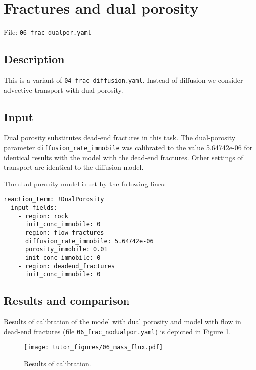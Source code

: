 \section{Fractures and dual porosity}

File: \texttt{06\_frac\_dualpor.yaml}

\subsection{Description}

This is a variant of \texttt{04\_frac\_diffusion.yaml}. Instead of
diffusion we consider advective transport with dual porosity.

\subsection{Input}

Dual porosity substitutes dead-end fractures in this task. The
dual-porosity parameter \texttt{diffusion\_rate\_immobile} was
calibrated to the value 5.64742e-06 for identical results with the model
with the dead-end fractures. Other settings of transport are identical
to the diffusion model.

The dual porosity model is set by the following lines:

\begin{verbatim}
reaction_term: !DualPorosity
  input_fields:
    - region: rock
      init_conc_immobile: 0
    - region: flow_fractures
      diffusion_rate_immobile: 5.64742e-06
      porosity_immobile: 0.01
      init_conc_immobile: 0
    - region: deadend_fractures
      init_conc_immobile: 0
\end{verbatim}

\subsection{Results and comparison}

Results of calibration of the model with dual porosity and model with
flow in dead-end fractures (file \texttt{06\_frac\_nodualpor.yaml}) is
depicted in Figure \ref{fig:calib}.

\begin{figure}
\hypertarget{fig:calib}{%
\centering
\texttt{[image: tutor\_figures/06\_mass\_flux.pdf]}
\caption{Results of calibration.}\label{fig:calib}
}
\end{figure}
